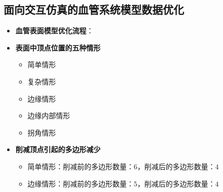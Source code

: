 \subsection[模型数据优化]{面向交互仿真的血管系统模型数据优化}

\begin{frame}
\begin{itemize}
  \item \textbf{血管表面模型优化流程}：
\end{itemize}
\begin{figure}[t]
\centering

\end{figure}
\end{frame}

\begin{frame}
\begin{itemize}
  \item \textbf{表面中顶点位置的五种情形}
  \begin{itemize}
    \item 简单情形
    \item 复杂情形
    \item 边缘情形
    \item 边缘内部情形
    \item 拐角情形
  \end{itemize}
\end{itemize}
\begin{figure}
\begin{minipage}[t]{0.8\linewidth}
\centering
\subfigure{

\quad

\quad

}
\subfigure{

\quad

}	
\end{minipage}
\end{figure}
\end{frame}

\begin{frame}
\begin{itemize}
  \item \textbf{削减顶点引起的多边形减少}
  \begin{itemize}
    \item 简单情形：削减前的多边形数量：$6$，削减后的多边形数量：$4$
    \item 边缘情形：削减前的多边形数量：$5$，削减后的多边形数量：$4$
  \end{itemize}
\end{itemize}
\begin{figure}
\begin{minipage}[t]{0.8\linewidth}
\centering
\subfigure{

}
\subfigure{

}	
\end{minipage}
\end{figure}
\end{frame}

